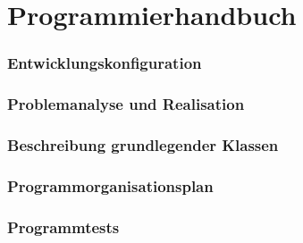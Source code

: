 \part{Programmierhandbuch}
\section{Entwicklungskonfiguration}
\section{Problemanalyse und Realisation}
\section{Beschreibung grundlegender Klassen}
\section{Programmorganisationsplan}
\section{Programmtests}